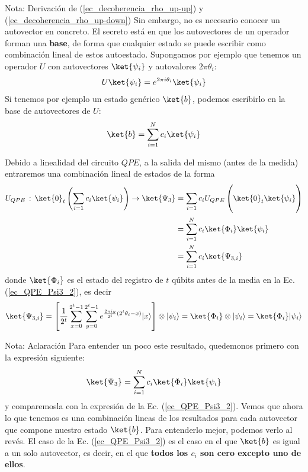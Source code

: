 \documentclass[a4paper,11pt]{book} %
\numberwithin{equation}{chapter}
\def\lc{\left[}
\def\rc{\right]}
\begin{document}
\begin{mybox_blue}{Nota: Derivación de (\ref{ec_decoherencia_rho_up-up}) y  (\ref{ec_decoherencia_rho_up-down})}
Sin embargo, no es necesario conocer un autovector en concreto. El secreto está en que los autovectores de un operador forman una \textbf{base}, de forma que cualquier estado se puede escribir como combinación lineal de estos autoestado. Supongamos por ejemplo que tenemos un operador $U$ con autovectores $\ket{\psi_i}$ y autovalores $2 \pi \theta_i$:
	\begin{equation} 
	U \ket{\psi_i} = e^{2 \pi i \theta_i} \ket{\psi_i}
	\end{equation}
Si tenemos por ejemplo un estado genérico $\ket{b}$, podemos escribirlo en la base de autovectores de $U$:
	\begin{equation} \label{ec_QPE_b_genérico}
	\ket{b} = \sum^N_{i=1} c_i \ket{\psi_i}
	\end{equation}

Debido a linealidad del circuito $QPE$, a la salida del mismo (antes de la medida) entraremos una combinación lineal de estados de la forma
	\begin{align*}
	U_{QPE}\, :\,\ket{0}_t \left(\sum_{i=1}c_i\ket{\psi_i}\right) \rightarrow \ket{\Psi_3} &= \sum_{i=1}c_i U_{QPE}\left(\ket{0}_t\ket{\psi_i} \rule{0mm}{7mm}\right)  \\ \rule{0mm}{7mm}
	& = \sum_{i=1}^N  c_i \ket{\Phi_i}\ket{\psi_i} \\ 
	& = \sum_{i=1}^N c_i \ket{\Psi_{3,i}}
	\end{align*}
donde $\ket{\Phi_i}$ es el estado del registro de $t$ qúbits antes de la media en la Ec. (\ref{ec_QPE_Psi3_2}), es decir
	\begin{equation}
	\ket{\Psi_{3,i}} = \lc \frac{1}{2^{t}} \sum_{x=0}^{2^t-1} \sum_{y=0}^{2^{t}-1}e^{\frac{2 \pi i y}{2^t} (2^t \theta_i - x)} |x\rangle \rc \otimes \vert\psi_i\rangle = \ket{\Phi_i} \otimes \vert\psi_i\rangle =  \ket{\Phi_i} \vert\psi_i\rangle
	\end{equation}

	\begin{mybox_blue}{Nota: Aclaración}	
	Para entender un poco este resultado, quedemonos primero con la expresión siguiente:
	\begin{equation} \label{ec_QPE_Psi_3_ci}
	\ket{\Psi_3}  = \sum_{i=1}^N  c_i \ket{\Phi_i}\ket{\psi_i} \\ \rule{0mm}{7mm}
	\end{equation}
	y comparemosla con la expresión de la Ec. (\ref{ec_QPE_Psi3_2}). Vemos que ahora lo que tenemos es una combinación lineas de los resultados para cada autovector que compone nuestro estado $\ket{b}$. Para entenderlo mejor, podemos verlo al revés. El caso de la Ec. (\ref{ec_QPE_Psi3_2}) es el caso en el que $\ket{b}$ es igual a un solo autovector, es decir, en el que \textbf{todos los $c_i$ son cero excepto uno de ellos}. 
	\end{mybox_blue}



\end{mybox_blue}
\end{document}
